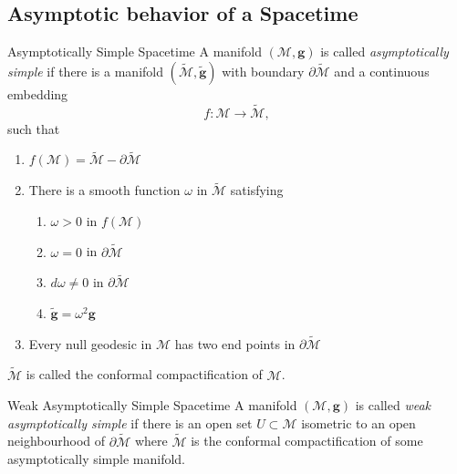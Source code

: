\documentclass{beamer}
\begin{document}
  \begin{darkframes} 
  \subsection{Asymptotic behavior of a Spacetime}
        \begin{frame}{Asymptotically Simple Spacetime}
			A manifold $\left(\mathcal{M},\mathbf{g}\right)$ is called \emph{asymptotically simple }if there is a manifold $\left(\tilde{\mathcal{M}},\tilde{\mathbf{g}}\right)$ with boundary $\partial\tilde{\mathcal{M}}$ and a continuous embedding 
            \begin{equation*}
            f:\mathcal{M}\longrightarrow{\mathcal{\tilde{M}}},
            \end{equation*}
            such that 
            \pause
            \begin{enumerate}
            \item $f\left(\mathcal{M}\right)=\tilde{\mathcal{M}}-\partial\tilde{\mathcal{M}}$
            \pause
            \item There is a smooth function $\omega$ in $\tilde{\mathcal{M}}$ satisfying
            \begin{enumerate}
            \item $\omega>0$ in $f\left(\mathcal{M}\right)$
            \item $\omega=0$ in $\partial\tilde{\mathcal{M}}$
            \item $d\omega\neq0$ in $\partial\tilde{\mathcal{M}}$
            \item $\tilde{\mathbf{g}}=\omega^{2}\mathbf{g}$
            \end{enumerate}
            \pause
            \item Every null geodesic in $\mathcal{M}$ has two end points in $\partial\tilde{\mathcal{M}}$
            \end{enumerate}
            \pause
            $\tilde{\mathcal{M}}$ is called the conformal compactification of $\mathcal{M}$.
        \end{frame}
        
        \begin{frame}{Weak Asymptotically Simple Spacetime}
        	A manifold $\left(\mathcal{M},\mathbf{g}\right)$ is called \emph{weak
asymptotically simple} if there is\emph{ }an open set $U\subset\mathcal{M}$
isometric to an open neighbourhood of \emph{$\partial\tilde{\mathcal{M}}$}
where $\tilde{\mathcal{M}}$ is the conformal compactification of some asymptotically simple manifold.
        \end{frame}
        

\end{darkframes}
\end{document}
